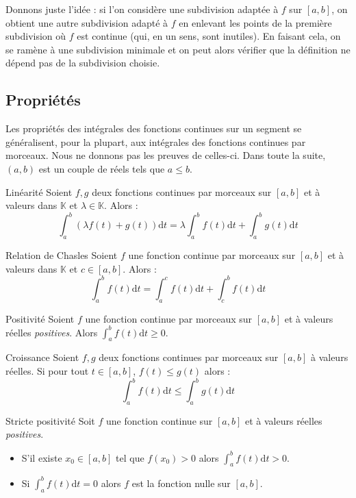 \documentclass[french,11pt,twoside]{VcCours}
\newcommand{\dt}{\text{d}t}
\newcommand{\Int}[2]{\int_{#1}^{#2}}
\begin{document}
\begin{Demonstration}{} Donnons juste l'idée : si l'on considère une subdivision adaptée à $f$ sur $[a,b]$, on obtient une autre subdivision adapté à $f$ en \og enlevant \fg les points de la première subdivision où $f$ est continue (qui, en un sens, sont inutiles). En faisant cela, on se ramène à une subdivision \og minimale \fg et on peut alors vérifier que la définition ne dépend pas de la subdivision choisie.
\end{Demonstration}

\subsection{Propriétés}

Les propriétés des intégrales des fonctions continues sur un segment se généralisent, pour la plupart, aux intégrales des fonctions continues par morceaux. Nous ne donnons pas les preuves de celles-ci. Dans toute la suite, $(a,b)$ est un couple de réels tels que $a \leq b$.

\begin{Proposition}{Linéarité} Soient $f,g$ deux fonctions continues par morceaux sur $[a,b]$ et à valeurs dans $\mathbb{K}$ et $\lambda \in \mathbb{K}$. Alors :
$$ \int_{a}^b (\lambda f(t) + g(t)) \dt = \lambda \int_{a}^b  f(t) \dt +  \int_{a}^b  g(t) \dt$$
\end{Proposition}

\begin{Proposition}{Relation de Chasles} Soient $f$ une fonction continue par morceaux sur $[a,b]$ et à valeurs dans $\mathbb{K}$ et $c \in [a,b]$. Alors :
$$ \int_{a}^b f(t) \dt = \int_{a}^c f(t) \dt + \int_{c}^b f(t) \dt $$
\end{Proposition}

\begin{Proposition}{Positivité} Soient $f$ une fonction continue par morceaux sur $[a,b]$ et à valeurs réelles \emph{positives}. Alors $\Int{a}{b} f(t) \dt \geq 0$.
\end{Proposition}

\begin{Proposition}{Croissance} Soient $f,g$ deux fonctions continues par morceaux sur $[a,b]$ à valeurs réelles. Si pour tout $t \in [a,b]$, $f(t) \leq g(t)$ alors :
$$\int_{a}^{b} f(t) \dt  \leq \int_{a}^{b} g(t) \dt $$
\end{Proposition}

\begin{Proposition}{Stricte positivité}  Soit $f$ une fonction continue sur $[a,b]$ et à valeurs réelles \emph{positives}. 

\begin{itemize}
\item S'il existe $x_0 \in [a,b]$ tel que $f(x_0)>0$ alors $\Int{a}{b} f(t) \dt>0$.
\item Si $\Int{a}{b} f(t) \dt =0$ alors $f$ est la fonction nulle sur $[a,b]$.
\end{itemize}
\end{Proposition}
\end{document}
